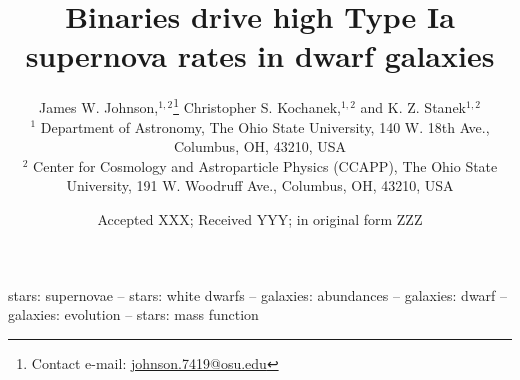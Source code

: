 \documentclass[fleqn, usenatbib]{mnras}
\title[Type Ia supernova rates]{Binaries drive high Type Ia supernova rates in
dwarf galaxies}
\author[J.W. Johnson, C.S. Kochanek \& K.Z. Stanek]{
	James W. Johnson,$^{1, 2}$\thanks{
		Contact e-mail: \href{mailto:johnson.7419@osu.edu}{johnson.7419@osu.edu}
	}
	Christopher S. Kochanek,$^{1, 2}$ and
	K. Z. Stanek$^{1, 2}$
	\\
	$^{1}$ Department of Astronomy, The Ohio State University,
	140 W. 18th Ave., Columbus, OH, 43210, USA
	\\
	$^{2}$ Center for Cosmology and Astroparticle Physics (CCAPP),
	The Ohio State University, 191 W. Woodruff Ave., Columbus, OH, 43210, USA
}
\date{Accepted XXX; Received YYY; in original form ZZZ}
\begin{document}
\label{firstpage}
\pagerange{\pageref{firstpage}--\pageref{lastpage}}
\maketitle



\begin{keywords}
stars: supernovae -- stars: white dwarfs -- galaxies: abundances -- galaxies:
dwarf -- galaxies: evolution -- stars: mass function
\end{keywords}












\label{lastpage}
\end{document}
